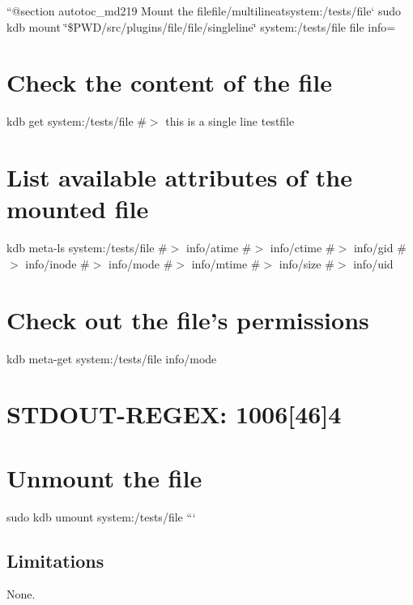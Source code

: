 ``{\ttfamily  @section autotoc\+\_\+md219 Mount the file}file/multiline{\ttfamily at}system\+:/tests/file` sudo kdb mount \char`\"{}\$\+P\+W\+D/src/plugins/file/file/singleline\char`\"{} system\+:/tests/file file info=\hypertarget{autotoc_md214_autotoc_md220}{}\section{Check the content of the file}\label{autotoc_md214_autotoc_md220}
kdb get system\+:/tests/file \#$>$ this is a single line testfile\hypertarget{autotoc_md214_autotoc_md221}{}\section{List available attributes of the mounted file}\label{autotoc_md214_autotoc_md221}
kdb meta-\/ls system\+:/tests/file \#$>$ info/atime \#$>$ info/ctime \#$>$ info/gid \#$>$ info/inode \#$>$ info/mode \#$>$ info/mtime \#$>$ info/size \#$>$ info/uid\hypertarget{autotoc_md214_autotoc_md222}{}\section{Check out the file’s permissions}\label{autotoc_md214_autotoc_md222}
kdb meta-\/get system\+:/tests/file info/mode \hypertarget{autotoc_md214_autotoc_md223}{}\section{S\+T\+D\+O\+U\+T-\/\+R\+E\+G\+E\+X\+: 1006\mbox{[}46\mbox{]}4}\label{autotoc_md214_autotoc_md223}
\hypertarget{autotoc_md214_autotoc_md224}{}\section{Unmount the file}\label{autotoc_md214_autotoc_md224}
sudo kdb umount system\+:/tests/file ```\hypertarget{autotoc_md214_autotoc_md225}{}\subsection{Limitations}\label{autotoc_md214_autotoc_md225}
None. 